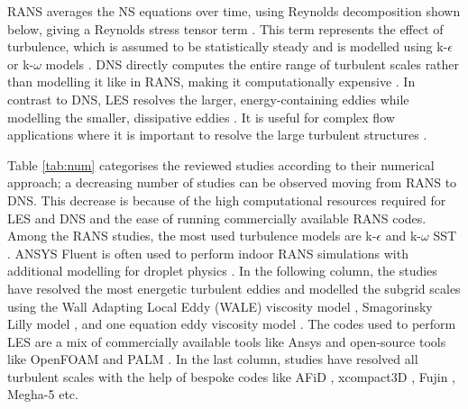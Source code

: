\documentclass[a4paper,12pt]{elsarticle}
\begin{document}
RANS averages the NS equations over time, using Reynolds decomposition shown below,
giving a Reynolds stress tensor term \cite{wilcox2006turbulence}. This term represents the effect of turbulence, which is assumed to be statistically steady and is modelled using k-$\epsilon$ or k-$\omega$ models \cite{pope2000turbulent}. DNS directly computes the entire range of turbulent scales rather than modelling it like in RANS, making it computationally expensive \cite{moin2011dns}. In contrast to DNS, LES resolves the larger, energy-containing eddies while modelling the smaller, dissipative eddies \cite{sagaut2006large}. It is useful for complex flow applications where it is important to resolve the large turbulent structures \cite{smagorinsky1963general}.

Table \ref{tab:num} categorises the reviewed studies according to their numerical approach; a decreasing number of studies can be observed moving from RANS to DNS. This decrease is because of the high computational resources required for LES and DNS and the ease of running commercially available RANS codes. Among the RANS studies, the most used turbulence models are k-$\epsilon$ \cite{ren2021numerical,ou2022insufficient} and k-$\omega$ SST \cite{dbouk2020coughing,yan2021transmission}. ANSYS Fluent is often used to perform indoor RANS simulations with additional modelling for droplet physics \cite{li2020investigating,wei2023effects}. In the following column, the studies have resolved the most energetic turbulent eddies and modelled the subgrid scales using the Wall Adapting Local Eddy (WALE) viscosity model \cite{feng2020study,zhang2019distribution}, Smagorinsky Lilly model \cite{wu2023numerical,li2022airborne}, and one equation eddy viscosity model \cite{pendar2020numerical}. The codes used to perform LES are a mix of commercially available tools like Ansys \cite{saarinen2015large,feng2020study} and open-source tools like OpenFOAM and PALM \cite{vuorinen2020modelling}. In the last column, studies have resolved all turbulent scales with the help of bespoke codes like AFiD \cite{chong2021extended}, xcompact3D \cite{giri2022colliding}, Fujin \cite{rosti2020fluid}, Megha-5 \cite{singhal2022virus} etc.
\end{document}
